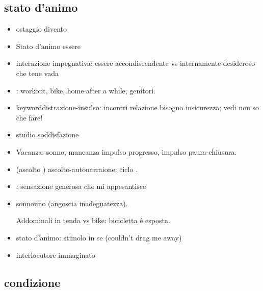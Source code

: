 \subsection{stato d’animo}

\begin{itemize}

\item ostaggio  divento 

\item Stato d’animo essere 

\item interazione impegnativa: essere accondiscendente vs internamente desideroso che tene vada

\item {}: workout, bike, home after a while, genitori.

\item keyword{distrazione-insulso}: incontri relazione bisogno insicurezza; vedi non so che fare!

\item {} studio soddisfazione

\item Vacanza: sonno, mancanza impulso progresso, impulso paura-chiusura.

\item (ascolto ) ascolto-autonarraione: ciclo .

\item {}: sensazione generosa che mi appesantisce

\item sonnonno (angoscia inadeguatezza).

Addominali in tenda vs bike: bicicletta \'e esposta.

\item stato d’animo: stimolo in se (couldn't drag me away)

\item interlocutore immaginato

\end{itemize}

\subsection{condizione}

